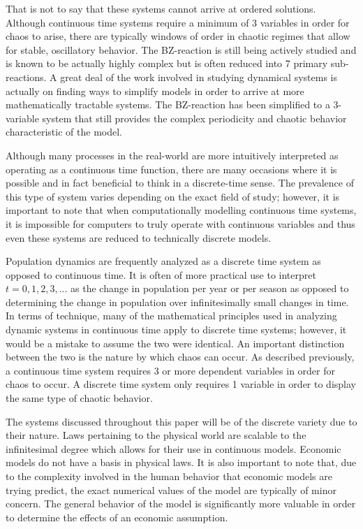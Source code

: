 That is not to say that these systems cannot arrive at ordered solutions.  Although continuous time systems require a minimum of 3 variables in order for chaos to arise, there are typically windows of order in chaotic regimes that allow for stable, oscillatory behavior. The BZ-reaction is still being actively studied and is known to be actually highly complex but is often reduced into 7 primary sub-reactions\autocite{Field1986}. A great deal of the work involved in studying dynamical systems is actually on finding ways to simplify models in order to arrive at more mathematically tractable systems. The BZ-reaction has been simplified to a 3-variable system that still provides the complex periodicity and chaotic behavior characteristic of the model\autocite{Gyorgyi1992}.

Although many processes in the real-world are more intuitively interpreted as operating as a continuous time  function, there are many  occasions where it is possible and  in fact beneficial to think in a discrete-time sense. The prevalence of this type of system varies depending on the exact field of study; however, it is important to note that when computationally modelling continuous time systems, it is impossible for computers to truly operate with continuous variables and thus even these systems are reduced to technically discrete models.

Population dynamics are frequently analyzed as a discrete time system as opposed to continuous time. It is often of more practical use to interpret $t= 0,1,2,3,...$ as the change in population per year or per season as opposed to determining the change in population over infinitesimally small changes in time. In terms of technique, many of the mathematical principles used in analyzing dynamic systems in continuous time apply to discrete time systems; however, it would be a mistake to assume the two were identical. An important distinction between the two is the nature by which chaos can occur. As described previously, a continuous time system requires 3 or more dependent variables in order for chaos to occur. A discrete time system only requires 1 variable in order to display the same type of chaotic behavior.

The systems discussed throughout this paper will be of the discrete variety due to their nature. Laws pertaining to the physical world are scalable to the infinitesimal degree which allows for their use in continuous models. Economic models do not have a basis in physical laws. It is also important to note that, due to the complexity involved in the human behavior that economic models are trying predict, the exact numerical values of the model are typically of minor concern. The general behavior of the model is significantly more valuable in order to determine the effects of an economic assumption.

